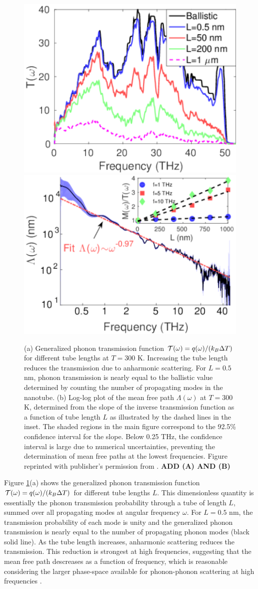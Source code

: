 \begin{figure}[tb]
 \begin{center}
  \includegraphics[width=.49\columnwidth]{pics/cnt_fig2.pdf} 
  \includegraphics[width=.49\columnwidth]{pics/cnt_fig4.pdf} 
  \caption{(a) Generalized phonon transmission function $\mathcal{T}(\omega)=q(\omega)/(k_B\Delta T)$ for different tube lengths at $T=300$ K. Increasing the tube length reduces the transmission due to anharmonic scattering. For $L=0.5$ nm, phonon transmission is nearly equal to the ballistic value determined by counting the number of propagating modes in the nanotube. (b) Log-log plot of the mean free path $\Lambda(\omega)$ at $T=300$ K, determined from the slope of the inverse transmission function as a function of tube length $L$ as illustrated by the dashed lines in the inset. The shaded regions in the main figure correspond to the 92.5\% confidence interval for the slope. Below 0.25 THz, the confidence interval is large due to numerical uncertainties, preventing the determination of mean free paths at the lowest frequencies. Figure reprinted with publisher's permission from . \textbf{ADD (A) AND (B)}}  
\label{fig:cnt_fig2}
 \end{center}
\end{figure}

Figure \ref{fig:cnt_fig2}(a) shows the generalized phonon transmission function $\mathcal{T}(\omega)=q(\omega)/(k_B\Delta T)$ for different tube lengths $L$. This dimensionless quantity is essentially the phonon transmission probability through a tube of length $L$, summed over all propagating modes at angular frequency $\omega$. For $L=0.5$ nm, the transmission probability of each mode is unity and the generalized phonon transmission is nearly equal to the number of propagating phonon modes (black solid line). As the tube length increases, anharmonic scattering reduces the transmission. This reduction is strongest at high frequencies, suggesting that the mean free path descreases as a function of frequency, which is reasonable considering the larger phase-space available for phonon-phonon scattering at high frequencies \cite{ziman}.


